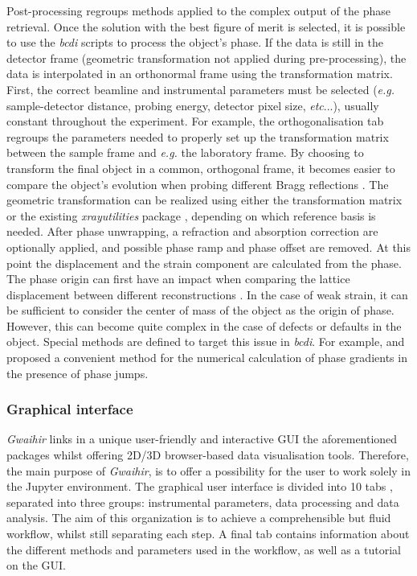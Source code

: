 Post-processing regroups methods applied to the complex output of the phase retrieval.
Once the solution with the best figure of merit is selected, it is possible to use the \textit{bcdi} scripts to process the object's phase.
If the data is still in the detector frame (geometric transformation not applied during pre-processing), the data is interpolated in an orthonormal frame using the transformation matrix.
First, the correct beamline and instrumental parameters must be selected (\textit{e.g.} sample-detector distance, probing energy, detector pixel size, \textit{etc}...), usually constant throughout the experiment.
For example, the orthogonalisation tab regroups the parameters needed to properly set up the transformation matrix between the sample frame and \textit{e.g.} the laboratory frame.
By choosing to transform the final object in a common, orthogonal frame, it becomes easier to compare the object's evolution when probing different Bragg reflections \parencite{crystal_sarah}.
The geometric transformation can be realized using either the transformation matrix \parencite{thesismark} or the existing  \textit{xrayutilities} package \parencite{kriegner_xrayutilities_2013}, depending on which reference basis is needed.
After phase unwrapping, a refraction and absorption correction are optionally applied, and possible phase ramp and phase offset are removed.
At this point the displacement and the strain component are calculated from the phase.
The phase origin can first have an impact when comparing the lattice displacement between different reconstructions \parencite{Atlan2023}.
In the case of weak strain, it can be sufficient to consider the center of mass of the object as the origin of phase.
However, this can become quite complex in the case of defects or defaults in the object.
Special methods are defined to target this issue in \textit{bcdi}.
For example, \cite{guizar-sicairos_phase_2011} and \cite{hofmann_nanoscale_2020} proposed a convenient method for the numerical calculation of phase gradients in the presence of phase jumps.

\subsubsection{Graphical interface}

\textit{Gwaihir} links in a unique user-friendly and interactive GUI the aforementioned packages whilst offering 2D/3D browser-based data visualisation tools.
Therefore, the main purpose of \textit{Gwaihir}, is to offer a possibility for the user to work solely in the Jupyter environment.
The graphical user interface is divided into 10 tabs %
, separated into three groups: instrumental parameters, data processing and data analysis.
The aim of this organization is to achieve a comprehensible but fluid workflow, whilst still separating each step.
A final tab contains information about the different methods and parameters used in the workflow, as well as a tutorial on the GUI.

